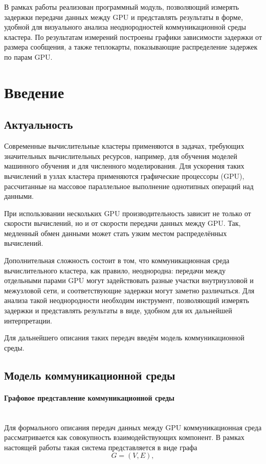 \documentclass[a4paper,14pt]{extarticle}
\begin{document}
В рамках работы реализован программный модуль, позволяющий измерять задержки передачи данных между GPU и представлять результаты в форме, удобной для визуального анализа неоднородностей коммуникационной среды кластера. По результатам измерений построены графики зависимости задержки от размера сообщения, а также теплокарты, показывающие распределение задержек по парам GPU.

\newpage
\tableofcontents

\newpage
\setcounter{section}{0}
\section{Введение}

\subsection{Актуальность}
\indent Современные вычислительные кластеры применяются в задачах, требующих значительных вычислительных ресурсов, например, для обучения моделей машинного обучения и для численного моделирования. Для ускорения таких вычислений в узлах кластера применяются графические процессоры (GPU), рассчитанные на массовое параллельное выполнение однотипных операций над данными.

При использовании нескольких GPU производительность зависит не только от скорости вычислений, но и от скорости передачи данных между GPU. Так, медленный обмен данными может стать узким местом распределённых вычислений.

Дополнительная сложность состоит в том, что коммуникационная среда вычислительного кластера, как правило, неоднородна: передачи между отдельными парами GPU могут задействовать разные участки внутриузловой и межузловой сети, и соответствующие задержки могут заметно различаться. Для анализа такой неоднородности необходим инструмент, позволяющий измерять задержки и представлять результаты в виде, удобном для их дальнейшей интерпретации.

Для дальнейшего описания таких передач введём модель коммуникационной среды.

\subsection{Модель коммуникационной среды}
\label{sec:communication-environment-model}
\paragraph{Графовое представление коммуникационной среды}\mbox{}\\
\indent Для формального описания передач данных между GPU коммуникационная среда рассматривается как совокупность взаимодействующих компонент. В рамках настоящей работы такая система представляется в виде графа
\[
G = (V, E),
\]
\end{document}

